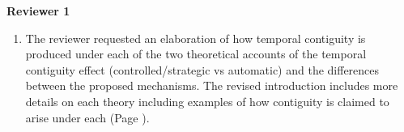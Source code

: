 \documentclass[12pt]{article}
\begin{document}
\vspace{20pt}

\textbf{\large{Reviewer 1}}

\begin{enumerate}

\item 
	The reviewer requested an elaboration of how temporal contiguity is produced under each of the two theoretical accounts of the temporal contiguity effect (controlled/strategic vs automatic) and the differences between the proposed mechanisms. The revised introduction includes more details on each theory including examples of how contiguity is claimed to arise under each (Page \pageref{TODO-2}). 


\end{enumerate}
\end{document}
